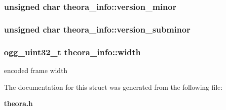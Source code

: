 \subsubsection{\setlength{\rightskip}{0pt plus 5cm}unsigned char \bf{theora\_\-info::version\_\-minor}}\label{structtheora__info_75eda4f30270d833c7b9dba43932a06a}


\subsubsection{\setlength{\rightskip}{0pt plus 5cm}unsigned char \bf{theora\_\-info::version\_\-subminor}}\label{structtheora__info_a07967ecd6e20bd2928ead42b6397b3d}


\subsubsection{\setlength{\rightskip}{0pt plus 5cm}ogg\_\-uint32\_\-t \bf{theora\_\-info::width}}\label{structtheora__info_17c2fc651bb3329f1ea6b13ff1d3957b}


encoded frame width 



The documentation for this struct was generated from the following file:\begin{CompactItemize}
\item 
\bf{theora.h}\end{CompactItemize}
